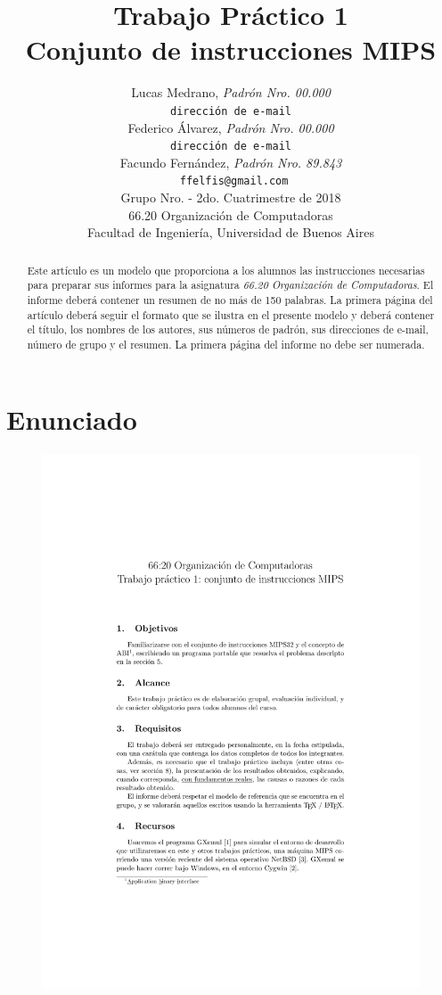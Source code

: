 \documentclass[a4paper, 12pt]{article}
\title{		\textbf{Trabajo Práctico 1}\\
			\textbf{Conjunto de instrucciones MIPS}
			}
\author{	Lucas Medrano, \textit{Padrón Nro. 00.000}                     \\
            \texttt{ dirección de e-mail }                                              \\
            Federico Álvarez, \textit{Padrón Nro. 00.000}                     \\
            \texttt{ dirección de e-mail }                                              \\
            Facundo Fernández, \textit{Padrón Nro. 89.843}                     \\
            \texttt{ ffelfis@gmail.com}                                              \\[2.5ex]
            \normalsize{Grupo Nro. \quad - 2do. Cuatrimestre de 2018}                       \\
            \normalsize{66.20 Organización de Computadoras}                             \\
            \normalsize{Facultad de Ingeniería, Universidad de Buenos Aires}            \\
       }
\date{}
\begin{document}
	\maketitle
	\thispagestyle{empty}
	\begin{abstract}
		Este artículo es un modelo que proporciona a los alumnos las instrucciones necesarias para preparar sus informes para la asignatura \textit{66.20 Organización de Computadoras}. El informe deberá contener un resumen de no más de 150 palabras. La primera página del artículo deberá seguir el formato que se ilustra en el presente modelo y deberá contener el título, los nombres de los autores, sus números de padrón, sus direcciones de e-mail, número de grupo y el resumen. La primera página del informe no debe ser numerada.
	\end{abstract}
	
	\pagebreak
	\thispagestyle{empty}
	\tableofcontents
	\newpage
	\setcounter{page}{1}
	\section{Enunciado}
	\begin{figure}[H]
		\centering
		\includegraphics[scale=1, page = 1, clip, trim=20mm 36mm 20mm 35mm]{files/enunciado.pdf}
	\end{figure}
	
\end{document}
